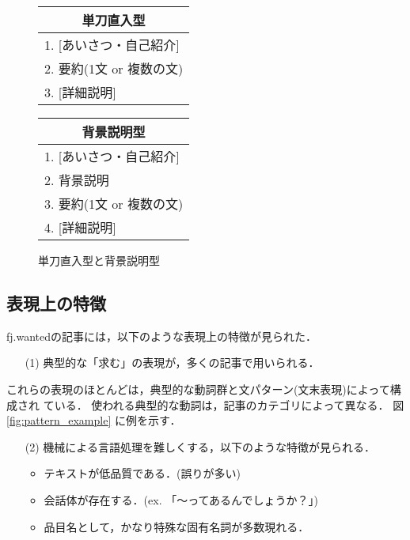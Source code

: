\begin{figure}
\begin{center} 
\begin{tabular}[t]{|l|}
\multicolumn{1}{c}{単刀直入型} \\ \hline
1. [あいさつ・自己紹介] \\
2. 要約(1文 or 複数の文) \\
3. [詳細説明] \\ \hline
\end{tabular}
\hspace*{10mm}
\begin{tabular}[t]{|l|}
\multicolumn{1}{c}{背景説明型} \\ \hline
1. [あいさつ・自己紹介] \\
2. 背景説明 \\
3. 要約(1文 or 複数の文) \\
4. [詳細説明] \\ \hline
\end{tabular}
\end{center}
\caption{単刀直入型と背景説明型}
\label{fig:structure}
\end{figure}

\subsection{表現上の特徴}

fj.wantedの記事には，以下のような表現上の特徴が見られた．
\begin{enumerate}
\item[(1)] 典型的な「求む」の表現が，多くの記事で用いられる．
\end{enumerate}
これらの表現のほとんどは，典型的な動詞群と文パターン(文末表現)によって構成され
ている．
使われる典型的な動詞は，記事のカテゴリによって異なる．
図\ref{fig:pattern_example} に例を示す．

\begin{enumerate}
\item[(2)] 機械による言語処理を難しくする，以下のような特徴が見られる．
\begin{itemize} 
\item テキストが低品質である．(誤りが多い)
\item 会話体が存在する．(ex. 「〜ってあるんでしょうか？」)
\item 品目名として，かなり特殊な固有名詞が多数現れる．
\end{itemize}
\end{enumerate}


